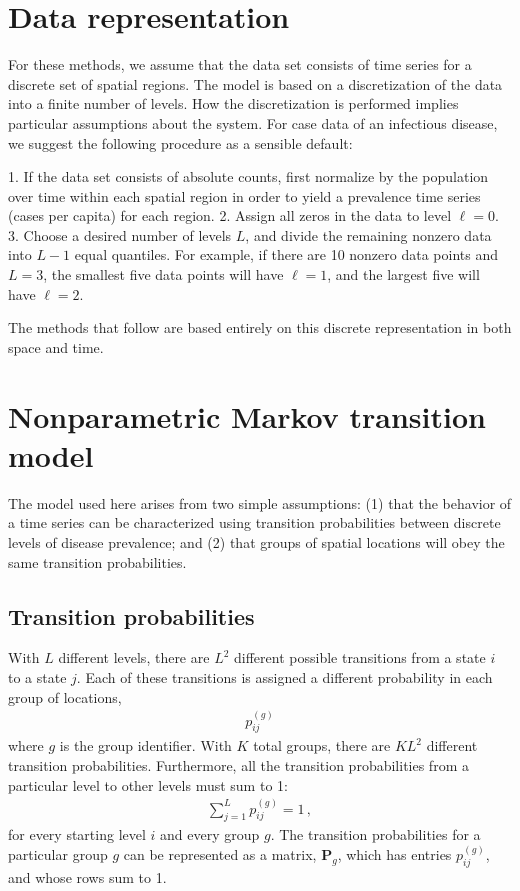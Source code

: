 \documentclass[12pt]{article}
\newcommand{\bP}{\mathbf{P}}
\begin{document}
\section{Data representation}
\label{data}

For these methods, we assume that the data set consists of time series for a discrete set of spatial regions. The model is based on a discretization of the data into a finite number of levels. How the discretization is performed implies particular assumptions about the system. For case data of an infectious disease, we suggest the following procedure as a sensible default:

1. If the data set consists of absolute counts, first normalize by the population over time within each spatial region in order to yield a prevalence time series (cases per capita) for each region.
2. Assign all zeros in the data to level $\ell = 0$.
3. Choose a desired number of levels $L$, and divide the remaining nonzero data into $L - 1$ equal quantiles. For example, if there are 10 nonzero data points and $L = 3$, the smallest five data points will have $\ell = 1$, and the largest five will have $\ell = 2$.

The methods that follow are based entirely on this discrete representation in both space and time.

\section{Nonparametric Markov transition model}
\label{model}

The model used here arises from two simple assumptions: (1) that the behavior of a time series can be characterized using transition probabilities between discrete levels of disease prevalence; and (2) that groups of spatial locations will obey the same transition probabilities.

\subsection{Transition probabilities}
\label{model-probs}

With $L$ different levels, there are $L^2$ different possible transitions from a state $i$ to a state $j$. Each of these transitions is assigned a different probability in each group of locations,
\begin{align}
	p_{ij}^{(g)}
\end{align}
where $g$ is the group identifier. With $K$ total groups, there are $K L^2$ different transition probabilities. Furthermore, all the transition probabilities from a particular level to other levels must sum to 1:
\begin{align}
	\sum_{j=1}^L p_{ij}^{(g)} = 1 \, ,
\end{align}
for every starting level $i$ and every group $g$. The transition probabilities for a particular group $g$ can be represented as a matrix, $\bP_g$, which has entries $p_{ij}^{(g)}$, and whose rows sum to 1.
\end{document}
